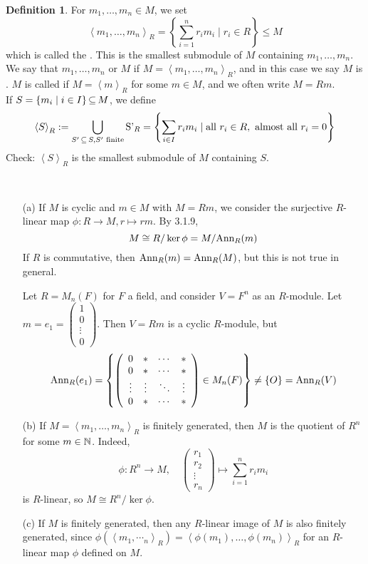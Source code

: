 \documentclass[11pt]{book}
\theoremstyle{definition}   \newtheorem{defn}[counter]{Definition} %
\newcommand{\mymatrix}[2]{\left( \begin{array}{#1} #2 \end{array} \right)}
\newcommand{\gen}[1]{\left\langle #1 \right\rangle}   \newcommand{\stab}[2]{\tn{Stab}_{#1}(#2)}   \newcommand{\fix}[2]{\tn{Fix}_{#1}(#2)}   \newcommand{\op}{^{\tn{op}}}
\newcommand{\ann}[2]{\textnormal{Ann}_{#1}(#2)}   \newcommand{\rk}{\textnormal{rk}}
\DeclareMathOperator{\ra}{\rightarrow}   \DeclareMathOperator{\Poly}{\mathbf{P}}   \DeclareMathOperator{\spn}{\textnormal{span}}   \DeclareMathOperator{\aut}{\textnormal{Aut}}
\newcommand{\vs}{\vspace{8pt}}
\numberwithin{counter}{chapter}
\begin{document}
\vs

\begin{defn}
For $m_1,\dots,m_n \in M$, we set
	\[\gen{m_1,\dots,m_n}_R = \left\{\sum_{i=1}^n r_i m_i \mid r_i \in R \right\} \leq M \]
which is called the . This is the smallest submodule of $M$ containing $m_1,\dots,m_n$. We say that $m_1,\dots,m_n$  or  $M$ if $M = \gen{m_1,\dots,m_n}_R$, and in this case we say $M$ is . $M$ is called  if $M = \gen{m}_R$ for some $m \in M$, and we often write $M = Rm$. \\

If $S = \{m_i \mid i \in I\} \operatorname{\subseteq} M$, we define
	\[\gen{S}_R := \bigcup_{S' \sub S, S' \tn{ finite}} \tn{S'}_R = \left\{\sum_{i \in I} r_i m_i \mid \tn{all } r_i \in R, \tn{ almost all $r_i = 0$} \right\} \]
Check: $\gen{S}_R$ is the smallest submodule of $M$ containing $S$.
\end{defn}

\vs


\begin{remark}\
\begin{enumerate}
\item[(a)] If $M$ is cyclic and $m \in M$ with $M = Rm$, we consider the surjective $R$-linear map $\phi : R \ra M, r \mapsto rm$. By 3.1.9,
	\[M \cong R/ \ker \phi = M/ \ann{R}{m} \]
If $R$ is commutative, then $\ann{R}{m} = \ann{R}{M}$, but this is not true in general.

\begin{example*}
Let $R = M_n(F)$ for $F$ a field, and consider $V = F^n$ as an $R$-module. Let $m = e_1 = \mymatrix{c}{1 \\ 0 \\ \vdots \\ 0}$. Then $V = Rm$ is a cyclic $R$-module, but
	\[\ann{R}{e_1} = \left\{\mymatrix{cccc}{0 & \ast & \cdots & \ast \\ 0 & \ast & \cdots & \ast \\ \vdots & \vdots & \ddots & \vdots \\ 0 & \ast & \cdots & \ast} \in M_n(F) \right\} \ne \{O\} = \ann{R}{V} \]
\end{example*}
\item[(b)] If $M = \gen{m_1,\dots,m_n}_R$ is finitely generated, then $M$ is the quotient of $R^n$ for some $m \in \operatorname{\mathbb{N}}$. Indeed,
	\[\phi : R^n \ra M, \quad \mymatrix{c}{r_1 \\ r_2 \\ \vdots \\ r_n} \mapsto \sum_{i=1}^n r_i m_i \]
is $R$-linear, so $M \cong R^n / \ker \phi$.

\item[(c)] If $M$ is finitely generated, then any $R$-linear image of $M$ is also finitely generated, since $\phi(\gen{m_1,\dotsm_n}_R) = \gen{\phi(m_1),\dots,\phi(m_n)}_R$ for an $R$-linear map $\phi$ defined on $M$.
\end{enumerate}
\end{remark}
\end{document}
